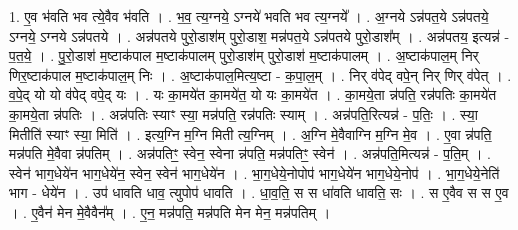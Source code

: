 \documentclass[17pt]{extarticle}
\begin{document}
1. ए॒व भ॑वति भव त्ये॒वैव भ॑वति । . भ॒व॒ त्य॒ग्नये॒ ऽग्नये॑ भवति भव त्य॒ग्नये᳚ । . अ॒ग्नये ऽन्न॑पत॒ये ऽन्न॑पतये॒ ऽग्नये॒ ऽग्नये ऽन्न॑पतये । . अन्न॑पतये पुरो॒डाश॑म् पुरो॒डाश॒ मन्न॑पत॒ये ऽन्न॑पतये पुरो॒डाश᳚म् । . अन्न॑पतय॒ इत्यन्न॑ - प॒त॒ये॒ । . पु॒रो॒डाश॑ म॒ष्टाक॑पाल म॒ष्टाक॑पालम् पुरो॒डाश॑म् पुरो॒डाश॑ म॒ष्टाक॑पालम् । . अ॒ष्टाक॑पाल॒म् निर् णिर॒ष्टाक॑पाल म॒ष्टाक॑पाल॒म् निः । . अ॒ष्टाक॑पाल॒मित्य॒ष्टा - क॒पा॒ल॒म् । . निर् व॑पेद् वपे॒न् निर् णिर् व॑पेत् । . व॒पे॒द् यो यो व॑पेद् वपे॒द् यः । . यः का॒मये॑त का॒मये॑त॒ यो यः का॒मये॑त । . का॒मये॒ता न्न॑पति॒ रन्न॑पतिः का॒मये॑त का॒मये॒ता न्न॑पतिः । . अन्न॑पतिः स्याꣳ स्या॒ मन्न॑पति॒ रन्न॑पतिः स्याम् । . अन्न॑पति॒रित्यन्न॑ - प॒तिः॒ । . स्या॒ मितीति॑ स्याꣳ स्या॒ मिति॑ । . इत्य॒ग्नि म॒ग्नि मिती त्य॒ग्निम् । . अ॒ग्नि मे॒वैवाग्नि म॒ग्नि मे॒व । . ए॒वा न्न॑पति॒ मन्न॑पति मे॒वैवा न्न॑पतिम् । . अन्न॑पतिꣳ॒॒ स्वेन॒ स्वेना न्न॑पति॒ मन्न॑पतिꣳ॒॒ स्वेन॑ । . अन्न॑पति॒मित्यन्न॑ - प॒ति॒म् । . स्वेन॑ भाग॒धेये॑न भाग॒धेये॑न॒ स्वेन॒ स्वेन॑ भाग॒धेये॑न । . भा॒ग॒धेये॒नोपोप॑ भाग॒धेये॑न भाग॒धेये॒नोप॑ । . भा॒ग॒धेये॒नेति॑ भाग - धेये॑न । . उप॑ धावति धाव॒ त्युपोप॑ धावति । . धा॒व॒ति॒ स स धा॑वति धावति॒ सः । . स ए॒वैव स स ए॒व । . ए॒वैन॑ मेन मे॒वैवैन᳚म् । . ए॒न॒ मन्न॑पति॒ मन्न॑पति मेन मेन॒ मन्न॑पतिम् । \newline
\end{document}
